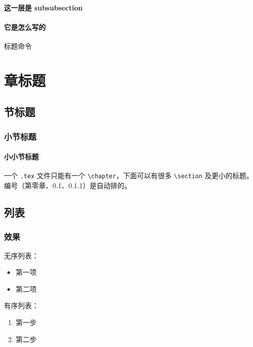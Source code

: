\subsubsection*{这一层是 subsubsection}

\subsubsection*{它是怎么写的}

\begin{codebox}[latex]{标题命令}
\chapter{章标题}        %
\section{节标题}
\subsection{小节标题}
\subsubsection{小小节标题}
\end{codebox}

一个 \texttt{.tex} 文件只能有一个 \texttt{\textbackslash chapter}，下面可以有很多 \texttt{\textbackslash section} 及更小的标题。编号（第零章、0.1、0.1.1）是自动排的。

\section{列表}

\subsection{效果}

无序列表：

\begin{itemize}
  \item 第一项
  \item 第二项
\end{itemize}

有序列表：

\begin{enumerate}
  \item 第一步
  \item 第二步
\end{enumerate}

